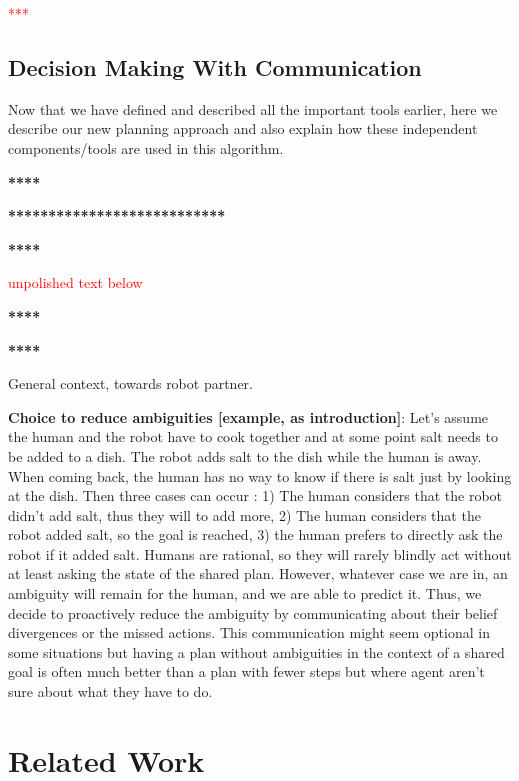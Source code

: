 \documentclass[letterpaper]{article} %
\begin{document}
\textcolor{red}{***}

\subsection{Decision Making With Communication}
Now that we have defined and described all the important tools earlier, here we describe our new planning approach and also explain how these independent components/tools are used in this algorithm. 



\textbf{**** }

\textbf{***************************}

\textbf{**** }

\textcolor{red}{unpolished text below}

\textbf{**** }

\textbf{**** }
% 

General context, towards robot partner. 


\textbf{Choice to reduce ambiguities [example, as introduction]}:
Let's assume the human and the robot have to cook together and at some point salt needs to be added to a dish. The robot adds salt to the dish while the human is away. When coming back, the human has no way to know if there is salt just by looking at the dish.
Then three cases can occur : 1) The human considers that the robot didn't add salt, thus they will to add more, 2) The human considers that the robot added salt, so the goal is reached, 3) the human prefers to directly ask the robot if it added salt. 
Humans are rational, so they will rarely blindly act without at least asking the state of the shared plan. However, whatever case we are in, an ambiguity will remain for the human, and we are able to predict it. Thus, we decide to proactively reduce the ambiguity by communicating about their belief divergences or the missed actions. This communication might seem optional in some situations but having a plan without ambiguities in the context of a shared goal is often much better than a plan with fewer steps but where agent aren't sure about what they have to do.

\section{Related Work}
\end{document}
